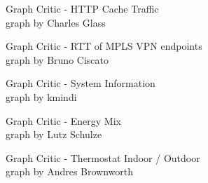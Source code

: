 
\begin{frame}{Graph Critic - HTTP Cache Traffic}
\\
graph by Charles Glass
\end{frame}

\begin{frame}{Graph Critic - RTT of MPLS VPN endpoints}
\\
graph by Bruno Ciscato
\end{frame}

\begin{frame}{Graph Critic - System Information}
\\
graph by kmindi
\end{frame}

\begin{frame}{Graph Critic - Energy Mix}
\\
graph by Lutz Schulze
\end{frame}

\begin{frame}{Graph Critic - Thermostat Indoor / Outdoor}
\\
graph by Andres Brownworth
\end{frame}



